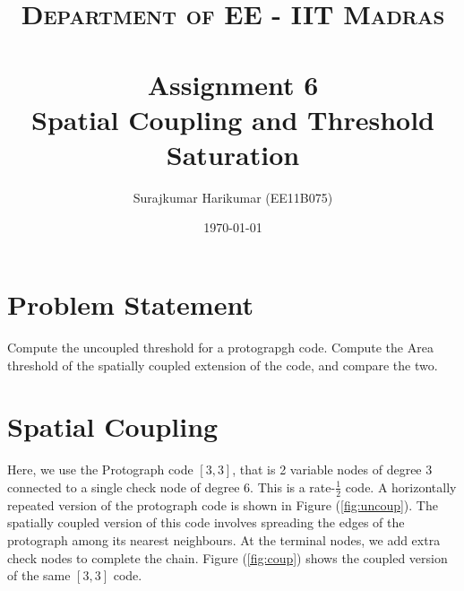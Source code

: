 \documentclass[paper=a4, fontsize=12pt]{scrartcl} %
\title{	
\normalfont \normalsize 
\textsc{Department of EE - IIT Madras} \\ [25pt] %
\horrule{0.5pt} \\[0.4cm] %
\huge Assignment 6 \\Spatial Coupling and Threshold Saturation %
\horrule{2pt} \\[0.5cm] %
}
\author{Surajkumar Harikumar (EE11B075)} %
\date{\normalsize\today} %
\numberwithin{equation}{section} %
\numberwithin{figure}{section} %
\numberwithin{table}{section} %
\begin{document}
\maketitle %


\section{Problem Statement}

Compute the uncoupled threshold for a protograpgh code. Compute the Area threshold of the spatially coupled extension of the code, and compare the two. 

\section{Spatial Coupling}

Here, we use the Protograph code $[3,3]$, that is 2 variable nodes of degree 3 connected to a single check node of degree 6. This is a rate-$\frac{1}{2}$ code. A horizontally repeated version of the protograph code is shown in Figure (\ref{fig:uncoup}). The spatially coupled version of this code involves spreading the edges of the protograph among its nearest neighbours. At the terminal nodes, we add extra check nodes to complete the chain. Figure (\ref{fig:coup}) shows the coupled version of the same $[3,3]$ code.  
\end{document}
